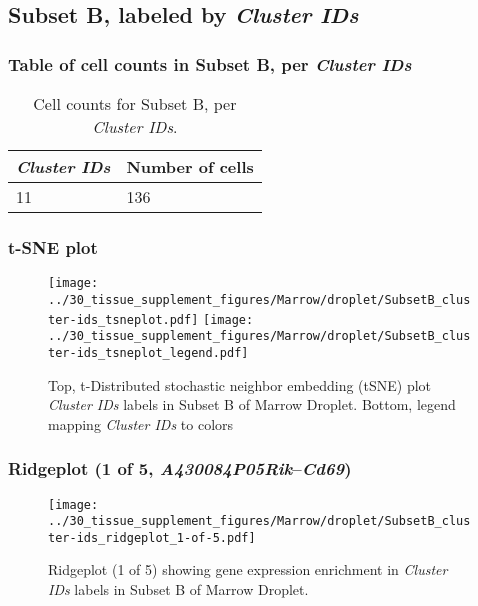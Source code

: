 \clearpage

\subsection{Subset B, labeled by \emph{Cluster IDs}}
\subsubsection{Table of cell counts in Subset B, per \emph{Cluster IDs}}\begin{table}[h]
\centering
\label{my-label}
\begin{tabular}{@{}ll@{}}
\toprule

\emph{Cluster IDs}& Number of cells \\ \midrule
11 & 136 \\
\bottomrule
\end{tabular}
\caption{Cell counts for Subset B, per \emph{Cluster IDs}.}
\end{table}

\clearpage
\subsubsection{t-SNE plot}
\begin{figure}[h]
\centering
\texttt{[image: ../30\_tissue\_supplement\_figures/Marrow/droplet/SubsetB\_cluster-ids\_tsneplot.pdf]}
\texttt{[image: ../30\_tissue\_supplement\_figures/Marrow/droplet/SubsetB\_cluster-ids\_tsneplot\_legend.pdf]}
\caption{Top, t-Distributed stochastic neighbor embedding (tSNE) plot  \emph{Cluster IDs} labels in Subset B of Marrow Droplet. Bottom, legend mapping \emph{Cluster IDs} to colors}
\end{figure}


\clearpage

\subsubsection{Ridgeplot (1 of 5, \emph{A430084P05Rik}--\emph{Cd69})}
\begin{figure}[h]
\centering
\texttt{[image: ../30\_tissue\_supplement\_figures/Marrow/droplet/SubsetB\_cluster-ids\_ridgeplot\_1-of-5.pdf]}

\caption{ Ridgeplot (1 of 5)  showing gene expression enrichment in \emph{Cluster IDs} labels in Subset B of Marrow Droplet. }
\end{figure}


\clearpage

